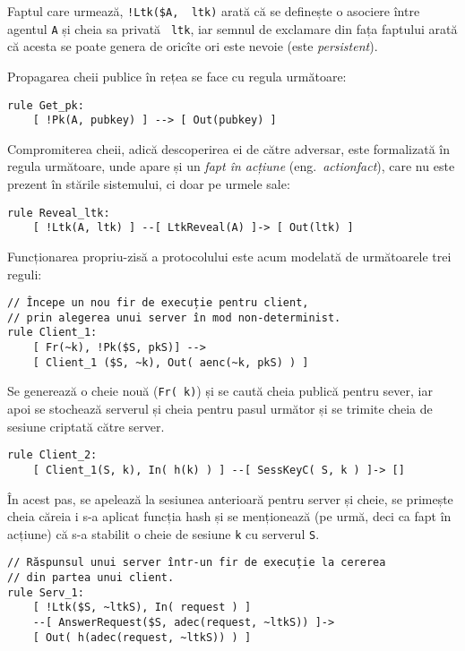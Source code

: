 Faptul care urmează, \texttt{!Ltk(\$A, ~ltk)} arată că se definește o asociere
între agentul \texttt{A} și cheia sa privată \texttt{~ltk}, iar semnul
de exclamare din fața faptului arată că acesta se poate genera de oricîte
ori este nevoie (este \emph{persistent}).

Propagarea cheii publice în rețea se face cu regula următoare:

\begin{verbatim}
rule Get_pk:
    [ !Pk(A, pubkey) ] --> [ Out(pubkey) ]
\end{verbatim}

Compromiterea cheii, adică descoperirea ei de către adversar, este formalizată
în regula următoare, unde apare și un \emph{fapt în acțiune} (eng.\
\emph{actionfact}), care nu este prezent în stările sistemului, ci doar pe
urmele sale:

\begin{verbatim}
rule Reveal_ltk:
    [ !Ltk(A, ltk) ] --[ LtkReveal(A) ]-> [ Out(ltk) ]
\end{verbatim}

Funcționarea propriu-zisă a protocolului este acum modelată de următoarele
trei reguli:

\begin{verbatim}
// Începe un nou fir de execuție pentru client,
// prin alegerea unui server în mod non-determinist.
rule Client_1:
    [ Fr(~k), !Pk($S, pkS)] -->
    [ Client_1 ($S, ~k), Out( aenc(~k, pkS) ) ]
\end{verbatim}

Se generează o cheie nouă (\texttt{Fr(~k)}) și se caută cheia publică
pentru sever, iar apoi se stochează serverul și cheia pentru pasul următor
și se trimite cheia de sesiune criptată către server.

\begin{verbatim}
rule Client_2:
    [ Client_1(S, k), In( h(k) ) ] --[ SessKeyC( S, k ) ]-> []
\end{verbatim}

În acest pas, se apelează la sesiunea anterioară pentru server și cheie,
se primește cheia căreia i s-a aplicat funcția hash și se menționează
(pe urmă, deci ca fapt în acțiune) că s-a stabilit o cheie de sesiune \texttt{k}
cu serverul \texttt{S}.

\begin{verbatim}
// Răspunsul unui server într-un fir de execuție la cererea
// din partea unui client.
rule Serv_1:
    [ !Ltk($S, ~ltkS), In( request ) ]
    --[ AnswerRequest($S, adec(request, ~ltkS)) ]->
    [ Out( h(adec(request, ~ltkS)) ) ]
\end{verbatim}

